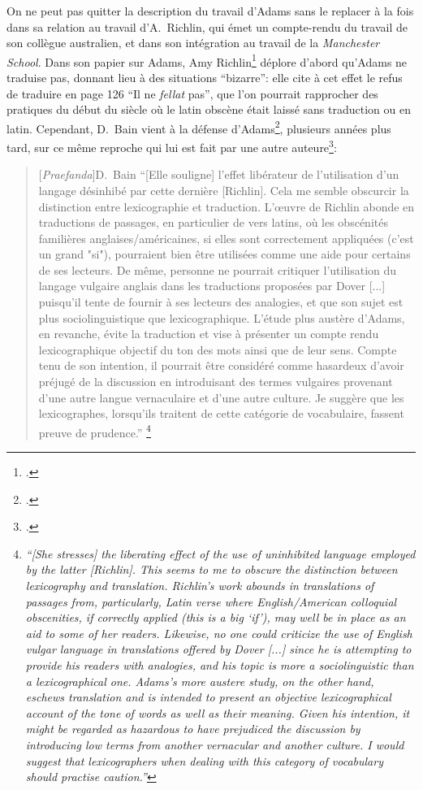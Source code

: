 On ne peut pas quitter la description du travail d'Adams sans le replacer à la fois dans sa relation au travail d'A.~Richlin, qui émet un compte-rendu du travail de son collègue australien, et dans son intégration au travail de la \textit{Manchester School}. Dans son papier sur Adams, Amy Richlin\footcite{richlin1984latin} déplore d'abord qu'Adams ne traduise pas, donnant lieu à des situations \enquote{bizarre}: elle cite à cet effet le refus de traduire en page 126 \enquote{Il ne \textit{fellat} pas}, que l'on pourrait rapprocher des pratiques du début du siècle où le latin obscène était laissé sans traduction ou en latin. Cependant, D.~Bain vient à la défense d'Adams\footcite[p.~408]{bain2014praefanda}, plusieurs années plus tard, sur ce même reproche qui lui est fait par une autre auteure\footcite{braund2002personal}:
\begin{quote}[\textit{Praefanda}]{D.~Bain}
    \enquote{[Elle souligne] l'effet libérateur de l'utilisation d'un langage désinhibé par cette dernière [Richlin]. Cela me semble obscurcir la distinction entre lexicographie et traduction. L'œuvre de Richlin abonde en traductions de passages, en particulier de vers latins, où les obscénités familières anglaises/américaines, si elles sont correctement appliquées (c'est un grand "si"), pourraient bien être utilisées comme une aide pour certains de ses lecteurs. De même, personne ne pourrait critiquer l'utilisation du langage vulgaire anglais dans les traductions proposées par Dover [...] puisqu'il tente de fournir à ses lecteurs des analogies, et que son sujet est plus sociolinguistique que lexicographique. L'étude plus austère d'Adams, en revanche, évite la traduction et vise à présenter un compte rendu lexicographique objectif du ton des mots ainsi que de leur sens. Compte tenu de son intention, il pourrait être considéré comme hasardeux d'avoir préjugé de la discussion en introduisant des termes vulgaires provenant d'une autre langue vernaculaire et d'une autre culture. Je suggère que les lexicographes, lorsqu'ils traitent de cette catégorie de vocabulaire, fassent preuve de prudence.}%
    \footnote{\textit{\enquote{[She stresses] the liberating effect of the use of uninhibited language employed by the latter [Richlin]. This seems to me to obscure the distinction between lexicography and translation. Richlin’s work abounds in translations of passages from, particularly, Latin verse where English/American colloquial obscenities, if correctly applied (this is a big ‘if’), may well be in place as an aid to some of her readers. Likewise, no one could criticize the use of English vulgar language in translations offered by Dover [...] since he is attempting to provide his readers with analogies, and his topic is more a sociolinguistic than a lexicographical one. Adams’s more austere study, on the other hand, eschews translation and is intended to present an objective lexicographical account of the tone of words as well as their meaning. Given his intention, it might be regarded as hazardous to have prejudiced the discussion by introducing low terms from another vernacular and another culture. I would suggest that lexicographers when dealing with this category of vocabulary should practise caution.}}}
\end{quote}
